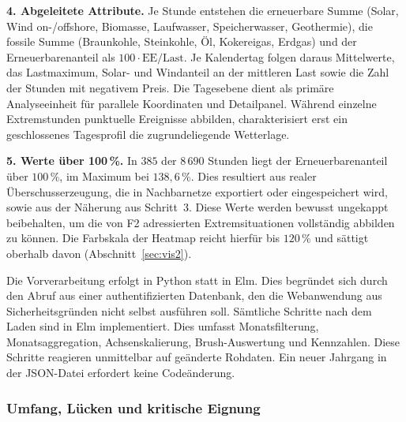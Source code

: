 \textbf{4. Abgeleitete Attribute.} Je Stunde entstehen die erneuerbare Summe (Solar, Wind on-/offshore,
Biomasse, Laufwasser, Speicherwasser, Geothermie), die fossile Summe (Braunkohle, Steinkohle, Öl,
Kokereigas, Erdgas) und der Erneuerbarenanteil als $100 \cdot \mathrm{EE}/\mathrm{Last}$. Je
Kalendertag folgen daraus Mittelwerte, das Lastmaximum, Solar- und Windanteil an der mittleren Last
sowie die Zahl der Stunden mit negativem Preis. Die Tagesebene dient als primäre
Analyseeinheit für parallele Koordinaten und Detailpanel. Während einzelne Extremstunden punktuelle
Ereignisse abbilden, charakterisiert erst ein geschlossenes Tagesprofil die zugrundeliegende Wetterlage.

\textbf{5. Werte über 100\,\%.} In $385$ der $8\,690$ Stunden liegt der Erneuerbarenanteil über
$100\,\%$, im Maximum bei $138{,}6\,\%$. Dies resultiert aus realer Überschusserzeugung, die in
Nachbarnetze exportiert oder eingespeichert wird, sowie aus der Näherung aus Schritt~3. Diese
Werte werden bewusst ungekappt beibehalten, um die von F2 adressierten Extremsituationen vollständig
abbilden zu können. Die Farbskala der Heatmap reicht hierfür bis $120\,\%$ und sättigt
oberhalb davon (Abschnitt~\ref{sec:vis2}).

Die Vorverarbeitung erfolgt in Python statt in Elm. Dies begründet sich durch den Abruf aus einer
authentifizierten Datenbank, den die Webanwendung aus Sicherheitsgründen nicht selbst ausführen soll.
Sämtliche Schritte nach dem Laden sind in Elm implementiert. Dies umfasst Monatsfilterung, Monatsaggregation,
Achsenskalierung, Brush-Auswertung und Kennzahlen. Diese Schritte reagieren unmittelbar auf geänderte
Rohdaten. Ein neuer Jahrgang in der JSON-Datei erfordert keine Codeänderung.

\subsubsection*{Umfang, Lücken und kritische Eignung}


